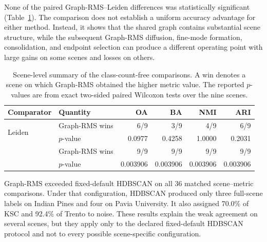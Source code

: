 \documentclass[10pt,a4paper,fleqn]{article}
\begin{document}
None of the paired Graph-RMS--Leiden differences was statistically significant
(Table~\ref{tab:no_k_statistics}). The comparison does not establish a
uniform accuracy advantage for either method. Instead, it shows that the
shared graph contains substantial scene structure, while the subsequent
Graph-RMS diffusion, fine-mode formation, consolidation, and endpoint
selection can produce a different operating point with large gains on some
scenes and losses on others.

\begin{table}[!t]
\centering
\footnotesize
\caption{Scene-level summary of the class-count-free comparisons. A win denotes
a scene on which Graph-RMS obtained the higher metric value. The reported
\(p\)-values are from exact two-sided paired Wilcoxon tests over the nine
scenes.}
\label{tab:no_k_statistics}

\renewcommand{\arraystretch}{1.05}
\setlength{\tabcolsep}{5pt}

\begin{tabular}{@{}llrrrr@{}}
\toprule
Comparator & Quantity & OA & BA & NMI & ARI \\
\midrule
\multirow{2}{*}{Leiden}
& Graph-RMS wins & 6/9 & 3/9 & 4/9 & 6/9 \\
& \(p\)-value    & 0.0977 & 0.4258 & 1.0000 & 0.2031 \\
\addlinespace[2pt]
\multirow{2}{*}{HDBSCAN}
& Graph-RMS wins & 9/9 & 9/9 & 9/9 & 9/9 \\
& \(p\)-value    & 0.003906 & 0.003906 & 0.003906 & 0.003906 \\
\bottomrule
\end{tabular}
\end{table}

Graph-RMS exceeded fixed-default HDBSCAN on all 36 matched scene--metric
comparisons. Under that configuration, HDBSCAN produced only three full-scene
labels on Indian Pines and four on Pavia University. It also assigned 70.0\%
of KSC and 92.4\% of Trento to noise. These results explain the weak agreement
on several scenes, but they apply only to the declared fixed-default HDBSCAN
protocol and not to every possible scene-specific configuration.
\end{document}
